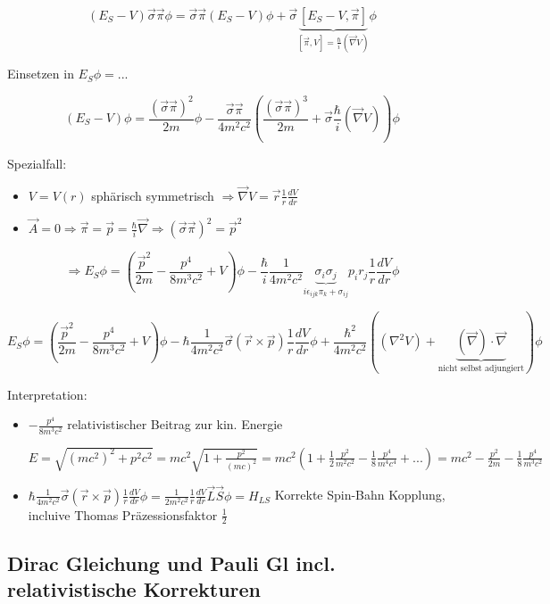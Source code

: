 \[(E_S-V)\vec\sigma\vec\pi\phi =\vec\sigma\vec\pi(E_S-V)\phi + \vec\sigma\underbrace{[E_S-V,\vec\pi]}_{[\vec\pi,V]=\frac{\hbar}{i}(\vec\nabla V)}\phi \]

Einsetzen in \(E_S \phi = ...\)

\[(E_S-V)\phi = \frac{(\vec\sigma\vec\pi)^2}{2m}\phi - \frac{\vec\sigma\vec\pi}{4m^2c^2}\left(\frac{(\vec\sigma\vec\pi)^3}{2m} +\vec\sigma \frac{\hbar}{i}(\vec\nabla V)\right)\phi \]

Spezialfall: 
\begin{itemize}
\item \(V=V(r)\) sphärisch symmetrisch \(\Rightarrow \vec\nabla V = \vec r \frac{1}{r}\frac{dV}{dr}\)
\item \(\vec A = 0 \Rightarrow \vec \pi = \vec p = \frac{\hbar}{i}\vec\nabla \Rightarrow (\vec\sigma \vec\pi)^2=\vec p^2\) 
\end{itemize}

\[\Rightarrow E_S\phi = ( \frac{\vec p^2}{2m} - \frac{p^4}{8m^3c^2}+V)\phi - \frac{\hbar}{i}\frac{1}{4m^2c^2}\underbrace{\sigma_i\sigma_j}_{i\epsilon_{ijk}\pi_k+\sigma_{ij}} p_ir_j\frac{1}{r}\frac{dV}{dr}\phi\]


\[E_S\phi = ( \frac{\vec p^2}{2m} - \frac{p^4}{8m^3c^2}+V)\phi - \hbar \frac{1}{4m^2c^2}\vec\sigma(\vec r\times\vec p)\frac{1}{r}\frac{dV}{dr}\phi + \frac{\hbar^2}{4m^2c^2}\left((\nabla^2 V)+\underbrace{(\vec\nabla)\cdot\vec\nabla}_{\text{nicht selbst adjungiert}}  \right)\phi\]


Interpretation:

\begin{itemize}
\item  \(- \frac{p^4}{8m^3c^2}\) relativistischer Beitrag zur kin. Energie

\(E = \sqrt{(mc^2)^2+p^2c^2} = mc^2\sqrt{1+\frac{p^2}{(mc)^2}}= mc^2(1+\frac{1}{2}\frac{p^2}{m^2c^2}-\frac{1}{8}\frac{p^4}{m^4c^4}+...) = mc^2-\frac{p^2}{2m}-\frac{1}{8}\frac{p^4}{m^3c^2}\)

\item \( \hbar \frac{1}{4m^2c^2}\vec\sigma(\vec r\times\vec p)\frac{1}{r}\frac{dV}{dr}\phi = \frac{1}{2m^2c^2}\frac{1}{r}\frac{dV}{dr}\vec L\vec S\phi = H_{LS} \) Korrekte Spin-Bahn Kopplung, incluive Thomas Präzessionsfaktor \(\frac{1}{2}\)
\end{itemize}


\subsection{Dirac Gleichung und Pauli Gl incl. relativistische Korrekturen}

